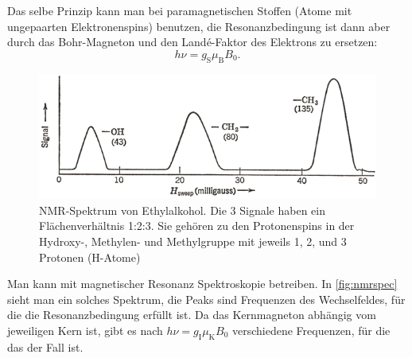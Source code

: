 Das selbe Prinzip kann man bei paramagnetischen Stoffen (Atome mit ungepaarten Elektronenspins) benutzen, die Resonanzbedingung ist dann aber durch das Bohr-Magneton und den Landé-Faktor des Elektrons zu ersetzen:
\begin{equation*}
	h\nu = g_\text{S}\mu_\text{B}B_0.
\end{equation*}
\begin{figure}
	\centering
	\includegraphics[width=.5\textwidth]{./img/nmrspec.jpg}
	\caption{NMR-Spektrum von Ethylalkohol. Die 3 Signale haben ein Flächenverhältnis 1:2:3. Sie gehören zu den Protonenspins in der Hydroxy-, Methylen- und Methylgruppe mit jeweils 1, 2, und 3 Protonen (H-Atome)}
	\label{fig:nmrspec}
\end{figure}
Man kann mit magnetischer Resonanz Spektroskopie betreiben.
In \autoref{fig:nmrspec} sieht man ein solches Spektrum, die Peaks sind Frequenzen des Wechselfeldes, für die die Resonanzbedingung erfüllt ist.
Da das Kernmagneton abhängig vom jeweiligen Kern ist, gibt es nach $h\nu = g_\text{I}\mu_\text{K}B_0$ verschiedene Frequenzen, für die das der Fall ist.
